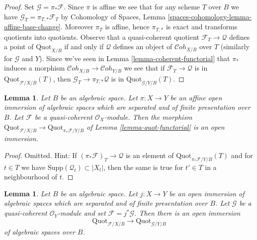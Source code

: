 \documentclass{stacks-project}
\theoremstyle{plain}
\newtheorem{lemma}[subsection]{Lemma}
\theoremstyle{definition}
\theoremstyle{remark}
\numberwithin{equation}{subsection}
\def\Cohstack{\mathcal{C}\!\mathit{oh}}
\def\Quotfunctor{\mathrm{Quot}}
\begin{document}
\begin{proof}
Set $\mathcal{G} = \pi_*\mathcal{F}$. Since $\pi$ is affine we see that for
any scheme $T$ over $B$ we have $\mathcal{G}_T = \pi_{T, *}\mathcal{F}_T$ by
Cohomology of Spaces, Lemma \ref{spaces-cohomology-lemma-affine-base-change}.
Moreover $\pi_T$ is affine, hence $\pi_{T, *}$ is exact and transforms
quotients into quotients. Observe that a quasi-coherent quotient
$\mathcal{F}_T \to \mathcal{Q}$ defines a point of $\Quotfunctor_{X/B}$
if and only if $\mathcal{Q}$ defines an object of $\Cohstack_{X/B}$
over $T$ (similarly for $\mathcal{G}$ and $Y$). Since we've seen in
Lemma \ref{lemma-coherent-functorial}
that $\pi_*$ induces a morphism $\Cohstack_{X/B} \to \Cohstack_{Y/B}$
we see that if $\mathcal{F}_T \to \mathcal{Q}$ is in
$\Quotfunctor_{\mathcal{F}/X/B}(T)$, then
$\mathcal{G}_T \to \pi_{T, *}\mathcal{Q}$ is
in $\Quotfunctor_{\mathcal{G}/Y/B}(T)$.
\end{proof}

\begin{lemma}
\label{lemma-quot-open}
Let $B$ be an algebraic space. Let $\pi : X \to Y$ be an affine open immersion
of algebraic spaces which are separated and of finite presentation over $B$.
Let $\mathcal{F}$ be a quasi-coherent $\mathcal{O}_X$-module. Then the morphism
$\Quotfunctor_{\mathcal{F}/X/B} \to \Quotfunctor_{\pi_*\mathcal{F}/Y/B}$ of
Lemma \ref{lemma-quot-functorial} is an open immersion.
\end{lemma}

\begin{proof}
Omitted. Hint: If $(\pi_*\mathcal{F})_T \to \mathcal{Q}$ is an element of
$\Quotfunctor_{\pi_*\mathcal{F}/Y/B}(T)$
and for $t \in T$ we have $\text{Supp}(\mathcal{Q}_t) \subset |X_t|$,
then the same is true for $t' \in T$ in a neighbourhood of $t$.
\end{proof}

\begin{lemma}
\label{lemma-quot-better-open}
Let $B$ be an algebraic space. Let $j : X \to Y$ be an open immersion
of algebraic spaces which are separated and of finite presentation over $B$.
Let $\mathcal{G}$ be a quasi-coherent $\mathcal{O}_Y$-module and set
$\mathcal{F} = j^*\mathcal{G}$. Then there is an open immersion
$$
\Quotfunctor_{\mathcal{F}/X/B}
\longrightarrow
\Quotfunctor_{\mathcal{G}/Y/B}
$$
of algebraic spaces over $B$.
\end{lemma}
\end{document}
